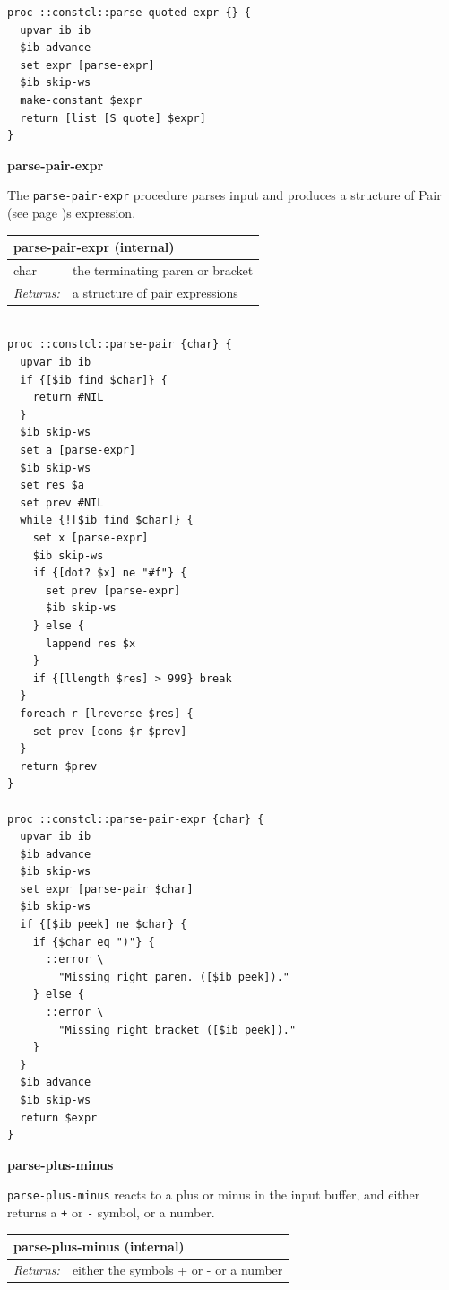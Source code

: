 \documentclass[twoside,9pt]{report}
\begin{document}
\noindent\makebox[\linewidth]{\rule{\linewidth}{0.4pt}}
\begin{lstlisting}
proc ::constcl::parse-quoted-expr {} {
  upvar ib ib
  $ib advance
  set expr [parse-expr]
  $ib skip-ws
  make-constant $expr
  return [list [S quote] $expr]
}
\end{lstlisting}
\noindent\makebox[\linewidth]{\rule{\linewidth}{0.4pt}}

\textbf{parse-pair-expr}


The \texttt{parse-pair-expr} procedure parses input and produces a structure of Pair (see page \pageref{pairs-and-lists})s expression.

\begin{tabular}{ |l l| }
\hline
\multicolumn{2}{|l|}{parse-pair-expr (internal)} \\
\hline
char & the terminating paren or bracket \\
\textit{Returns:} & a structure of pair expressions \\
\hline
\end{tabular}

\noindent\makebox[\linewidth]{\rule{\linewidth}{0.4pt}}
\begin{lstlisting}
 
proc ::constcl::parse-pair {char} {
  upvar ib ib
  if {[$ib find $char]} {
    return #NIL
  }
  $ib skip-ws
  set a [parse-expr]
  $ib skip-ws
  set res $a
  set prev #NIL
  while {![$ib find $char]} {
    set x [parse-expr]
    $ib skip-ws
    if {[dot? $x] ne "#f"} {
      set prev [parse-expr]
      $ib skip-ws
    } else {
      lappend res $x
    }
    if {[llength $res] > 999} break
  }
  foreach r [lreverse $res] {
    set prev [cons $r $prev]
  }
  return $prev
}
 
proc ::constcl::parse-pair-expr {char} {
  upvar ib ib
  $ib advance
  $ib skip-ws
  set expr [parse-pair $char]
  $ib skip-ws
  if {[$ib peek] ne $char} {
    if {$char eq ")"} {
      ::error \
        "Missing right paren. ([$ib peek])."
    } else {
      ::error \
        "Missing right bracket ([$ib peek])."
    }
  }
  $ib advance
  $ib skip-ws
  return $expr
}
\end{lstlisting}
\noindent\makebox[\linewidth]{\rule{\linewidth}{0.4pt}}

\textbf{parse-plus-minus}


\texttt{parse-plus-minus} reacts to a plus or minus in the input buffer, and either returns a \texttt{+} or \texttt{-} symbol, or a number.

\begin{tabular}{ |l l| }
\hline
\multicolumn{2}{|l|}{parse-plus-minus (internal)} \\
\hline
\textit{Returns:} & either the symbols + or - or a number \\
\hline
\end{tabular}
\end{document}
